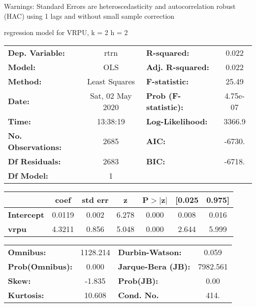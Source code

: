 Warnings: \newline
 [1] Standard Errors are heteroscedasticity and autocorrelation robust (HAC) using 1 lags and without small sample correction\ 

regression model for VRPU, k = 2 h = 2\begin{center}
\begin{tabular}{lclc}
\toprule
\textbf{Dep. Variable:}    &       rtrn       & \textbf{  R-squared:         } &     0.022   \\
\textbf{Model:}            &       OLS        & \textbf{  Adj. R-squared:    } &     0.022   \\
\textbf{Method:}           &  Least Squares   & \textbf{  F-statistic:       } &     25.49   \\
\textbf{Date:}             & Sat, 02 May 2020 & \textbf{  Prob (F-statistic):} &  4.75e-07   \\
\textbf{Time:}             &     13:38:19     & \textbf{  Log-Likelihood:    } &    3366.9   \\
\textbf{No. Observations:} &        2685      & \textbf{  AIC:               } &    -6730.   \\
\textbf{Df Residuals:}     &        2683      & \textbf{  BIC:               } &    -6718.   \\
\textbf{Df Model:}         &           1      & \textbf{                     } &             \\
\bottomrule
\end{tabular}
\begin{tabular}{lcccccc}
                   & \textbf{coef} & \textbf{std err} & \textbf{z} & \textbf{P$> |$z$|$} & \textbf{[0.025} & \textbf{0.975]}  \\
\midrule
\textbf{Intercept} &       0.0119  &        0.002     &     6.278  &         0.000        &        0.008    &        0.016     \\
\textbf{vrpu}      &       4.3211  &        0.856     &     5.048  &         0.000        &        2.644    &        5.999     \\
\bottomrule
\end{tabular}
\begin{tabular}{lclc}
\textbf{Omnibus:}       & 1128.214 & \textbf{  Durbin-Watson:     } &    0.059  \\
\textbf{Prob(Omnibus):} &   0.000  & \textbf{  Jarque-Bera (JB):  } & 7982.561  \\
\textbf{Skew:}          &  -1.835  & \textbf{  Prob(JB):          } &     0.00  \\
\textbf{Kurtosis:}      &  10.608  & \textbf{  Cond. No.          } &     414.  \\
\bottomrule
\end{tabular}
\end{center}

